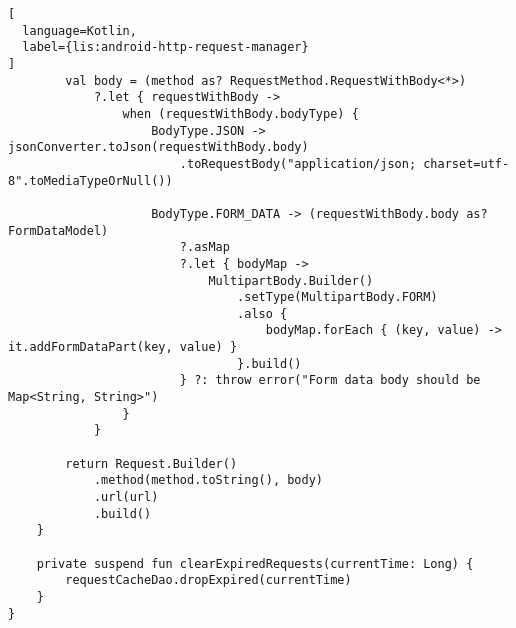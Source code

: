 \begin{lstlisting}[
  language=Kotlin,
  label={lis:android-http-request-manager}
]
        val body = (method as? RequestMethod.RequestWithBody<*>)
            ?.let { requestWithBody ->
                when (requestWithBody.bodyType) {
                    BodyType.JSON -> jsonConverter.toJson(requestWithBody.body)
                        .toRequestBody("application/json; charset=utf-8".toMediaTypeOrNull())

                    BodyType.FORM_DATA -> (requestWithBody.body as? FormDataModel)
                        ?.asMap
                        ?.let { bodyMap ->
                            MultipartBody.Builder()
                                .setType(MultipartBody.FORM)
                                .also {
                                    bodyMap.forEach { (key, value) -> it.addFormDataPart(key, value) }
                                }.build()
                        } ?: throw error("Form data body should be Map<String, String>")
                }
            }

        return Request.Builder()
            .method(method.toString(), body)
            .url(url)
            .build()
    }

    private suspend fun clearExpiredRequests(currentTime: Long) {
        requestCacheDao.dropExpired(currentTime)
    }
}
\end{lstlisting}